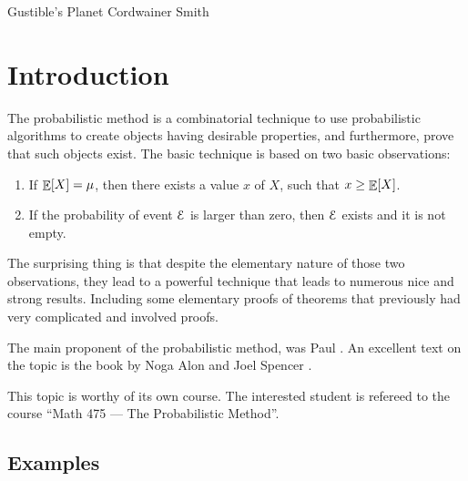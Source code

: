 %

\ChapterPrefix{}
\ChapterGen{}



%
{Gustible's Planet}%
{Cordwainer Smith}



\section{Introduction}

The probabilistic method is a combinatorial technique to use
probabilistic algorithms to create objects having desirable
properties, and furthermore, prove that such objects exist. The basic
technique is based on two basic observations:
\begin{enumerate}
    \item If $\mathop{\mathbb{E}}\!\left[ {X} \right] = \mu$, then there exists a value $x$ of $X$,
    such that $x \geq \mathop{\mathbb{E}}\!\left[ {X} \right]$.

    \item If the probability of event $\EuScript{E}$ is larger than zero, then
    $\EuScript{E}$ exists and it is not empty.
\end{enumerate}
The surprising thing is that despite the elementary nature of those
two observations, they lead to a powerful technique that leads to
numerous nice and strong results. Including some elementary proofs of
theorems that previously had very complicated and involved proofs.

The main proponent of the probabilistic method, was Paul
\Erdos{}. An excellent text on the topic is the book by Noga
Alon and Joel Spencer \cite{as-pm-00}. 

This topic is worthy of its own course. The interested
student is refereed to the course ``Math 475 --- The
Probabilistic Method''.

\subsection{Examples}

